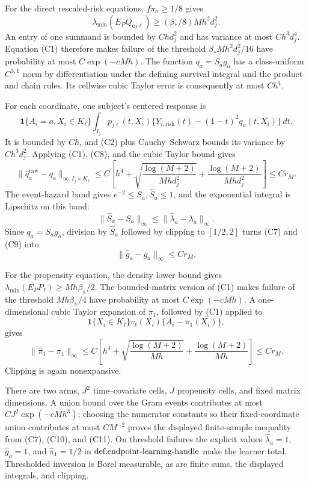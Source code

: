 For the direct rescaled-risk equations, \(f\pi_a\ge1/8\) gives
\[
 \lambda_{\min}(E_PQ_{aj\ell})\ge(\beta_*/8)Mh^2d_j^2.               \tag{C8}
\]
An entry of one summand is bounded by \(Chd_j^2\) and has variance at most \(Ch^3d_j^4\).  Equation (C1) therefore makes failure of the threshold \(\beta_*Mh^2d_j^2/16\) have probability at most \(C\exp(-cMh)\).  The function \(q_a=S_ag_a\) has a class-uniform \(C^{3,1}\) norm by differentiation under the defining survival integral and the product and chain rules.  Its cellwise cubic Taylor error is consequently at most \(Ch^4\).

For each coordinate, one subject's centered response is
\[
 \mathbf 1\{A_i=a,X_i\in K_\ell\}\int_{I_j}p_{j\ell}(t,X_i)
 \{Y_{i,\mathrm{risk}}(t)-(1-t)^2q_a(t,X_i)\}\,dt.
\]
It is bounded by \(Ch\), and (C2) plus Cauchy--Schwarz bounds its variance by \(Ch^3d_j^2\).  Applying (C1), (C8), and the cubic Taylor bound gives
\[
 \lVert\widehat q_a^{\mathrm{raw}}-q_a\rVert_{\infty,I_j\times K_\ell}
 \le C\left[h^4+\sqrt{\frac{\log(M+2)}{Mhd_j^2}}
 +\frac{\log(M+2)}{Mhd_j^2}\right]\le Cr_M.                          \tag{C9}
\]
The event-hazard band gives \(e^{-2}\le S_a,\widehat S_a\le1\), and the exponential integral is Lipschitz on this band:
\[
 \lVert\widehat S_a-S_a\rVert_\infty
 \le\lVert\widehat\lambda_a-\lambda_a\rVert_\infty.
\]
Since \(q_a=S_ag_a\), division by \(\widehat S_a\) followed by clipping to \([1/2,2]\) turns (C7) and (C9) into
\[
 \lVert\widehat g_a-g_a\rVert_\infty\le Cr_M.                        \tag{C10}
\]

For the propensity equation, the density lower bound gives \(\lambda_{\min}(E_PP_\ell)\ge Mh\beta_\pi/2\).  The bounded-matrix version of (C1) makes failure of the threshold \(Mh\beta_\pi/4\) have probability at most \(C\exp(-cMh)\).  A one-dimensional cubic Taylor expansion of \(\pi_1\), followed by (C1) applied to
\[
 \mathbf 1\{X_i\in K_\ell\}v_\ell(X_i)\{A_i-\pi_1(X_i)\},
\]
gives
\[
 \lVert\widehat\pi_1-\pi_1\rVert_\infty
 \le C\left[h^4+\sqrt{\frac{\log(M+2)}{Mh}}
 +\frac{\log(M+2)}{Mh}\right]\le Cr_M.                              \tag{C11}
\]
Clipping is again nonexpansive.

There are two arms, \(J^2\) time--covariate cells, \(J\) propensity cells, and fixed matrix dimensions.  A union bound over the Gram events contributes at most \(CJ^2\exp(-cMh^3)\); choosing the numerator constants so their fixed-coordinate union contributes at most \(CM^{-2}\) proves the displayed finite-sample inequality from (C7), (C10), and (C11).  On threshold failures the explicit values \(\widehat\lambda_a=1\), \(\widehat g_a=1\), and \(\widehat\pi_1=1/2\) in \(\textnormal{def:endpoint-learning-handle}\) make the learner total.  Thresholded inversion is Borel measurable, as are finite sums, the displayed integrals, and clipping.

